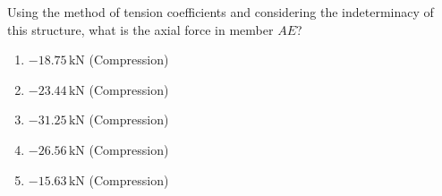 \documentclass[12pt,a4paper]{article}
\begin{document}
\begin{questionbox}
Using the method of tension coefficients and considering the indeterminacy of this structure, 
what is the axial force in member $AE$?

\begin{mcqbox}
\begin{enumerate}[label=(\Alph*),leftmargin=*]
    \item $-18.75\,\text{kN}$ (Compression)
    \item $-23.44\,\text{kN}$ (Compression)
    \item $-31.25\,\text{kN}$ (Compression)
    \item $-26.56\,\text{kN}$ (Compression)
    \item $-15.63\,\text{kN}$ (Compression)
\end{enumerate}
\end{mcqbox}
\end{questionbox}
\end{document}
